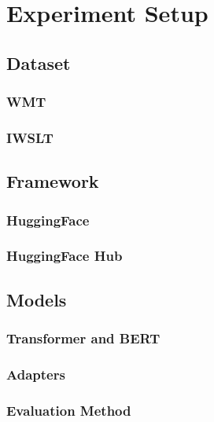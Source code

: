 \chapter{Experiment Setup}

\section{Dataset}
\subsection{WMT}
\subsection{IWSLT}

\section{Framework}
\subsection{HuggingFace}
\subsection{HuggingFace Hub}

\section{Models}
\subsection{Transformer and BERT}
\subsection{Adapters}
\subsection{Evaluation Method}
